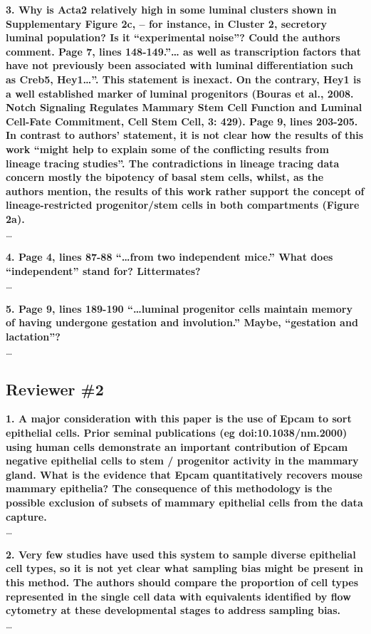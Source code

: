 \documentclass{article}
\begin{document}
\textbf{3. Why is Acta2 relatively high in some luminal clusters shown in Supplementary Figure 2c, – for instance, in Cluster 2, secretory luminal population? Is it “experimental noise”? Could the authors comment.
Page 7, lines 148-149.”… as well as transcription factors that have not previously been associated with luminal differentiation such as Creb5, Hey1…”. This statement is inexact. On the contrary, Hey1 is a well established marker of luminal progenitors (Bouras et al., 2008. Notch Signaling Regulates Mammary Stem Cell Function and Luminal Cell-Fate Commitment, Cell Stem Cell, 3: 429).
Page 9, lines 203-205. In contrast to authors’ statement, it is not clear how the results of this work “might help to explain some of the conflicting results from lineage tracing studies”. The contradictions in lineage tracing data concern mostly the bipotency of basal stem cells, whilst, as the authors mention, the results of this work rather support the concept of lineage-restricted progenitor/stem cells in both compartments (Figure 2a).}\\
\ldots

\textbf{4. Page 4, lines 87-88 “…from two independent mice.” What does “independent” stand for? Littermates?}\\
\ldots

\textbf{5. Page 9, lines 189-190 “…luminal progenitor cells maintain memory of having undergone gestation and involution.” Maybe, “gestation and lactation”?}\\
\ldots

\subsection*{Reviewer \#2}
\textbf{1. A major consideration with this paper is the use of Epcam to sort epithelial cells. Prior seminal publications (eg doi:10.1038/nm.2000) using human cells demonstrate an important contribution of Epcam negative epithelial cells to stem / progenitor activity in the mammary gland. What is the evidence that Epcam quantitatively recovers mouse mammary epithelia? The consequence of this methodology is the possible exclusion of subsets of mammary epithelial cells from the data capture.}\\
\ldots

\textbf{2. Very few studies have used this system to sample diverse epithelial cell types, so it is not yet clear what sampling bias might be present in this method. The authors should compare the proportion of cell types represented in the single cell data with equivalents identified by flow cytometry at these developmental stages to address sampling bias.}\\
\ldots
\end{document}
